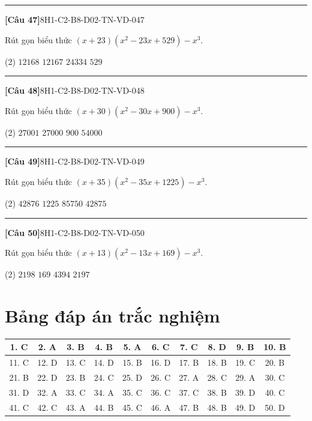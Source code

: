 \documentclass[12pt,a4paper]{article}
\newif\ifloigiai
\newenvironment{cauhoi}[2]{%
  \par\medskip\noindent\rule{\textwidth}{0.4pt}\par\nopagebreak
  \noindent\textbf{[#1]}\hfill{\scriptsize\ttfamily #2}\par\nopagebreak\smallskip}{\par}
\newcommand{\dapan}[1]{\ifloigiai\par\smallskip\noindent\textit{Đáp án:} \textbf{#1}\par\fi}
\begin{document}
\begin{cauhoi}{Câu 47}{8H1-C2-B8-D02-TN-VD-047}
Rút gọn biểu thức $(x+23)(x^{2}-23x+529)-x^{3}$.
\begin{tasks}(2)
\task $12168$
\task $12167$
\task $24334$
\task $529$
\end{tasks}
\dapan{B}
\end{cauhoi}
\begin{cauhoi}{Câu 48}{8H1-C2-B8-D02-TN-VD-048}
Rút gọn biểu thức $(x+30)(x^{2}-30x+900)-x^{3}$.
\begin{tasks}(2)
\task $27001$
\task $27000$
\task $900$
\task $54000$
\end{tasks}
\dapan{B}
\end{cauhoi}
\begin{cauhoi}{Câu 49}{8H1-C2-B8-D02-TN-VD-049}
Rút gọn biểu thức $(x+35)(x^{2}-35x+1225)-x^{3}$.
\begin{tasks}(2)
\task $42876$
\task $1225$
\task $85750$
\task $42875$
\end{tasks}
\dapan{D}
\end{cauhoi}
\begin{cauhoi}{Câu 50}{8H1-C2-B8-D02-TN-VD-050}
Rút gọn biểu thức $(x+13)(x^{2}-13x+169)-x^{3}$.
\begin{tasks}(2)
\task $2198$
\task $169$
\task $4394$
\task $2197$
\end{tasks}
\dapan{D}
\end{cauhoi}
\clearpage\section*{Bảng đáp án trắc nghiệm}
\begin{center}\begin{tabular}{|c|c|c|c|c|c|c|c|c|c|}
\hline
1. C & 2. A & 3. B & 4. B & 5. A & 6. C & 7. C & 8. D & 9. B & 10. B\\\hline
11. C & 12. D & 13. C & 14. D & 15. B & 16. D & 17. B & 18. B & 19. C & 20. B\\\hline
21. B & 22. D & 23. B & 24. C & 25. D & 26. C & 27. A & 28. C & 29. A & 30. C\\\hline
31. D & 32. A & 33. C & 34. A & 35. C & 36. C & 37. C & 38. B & 39. D & 40. C\\\hline
41. C & 42. C & 43. A & 44. B & 45. C & 46. A & 47. B & 48. B & 49. D & 50. D\\\hline
\end{tabular}\end{center}
\end{document}

